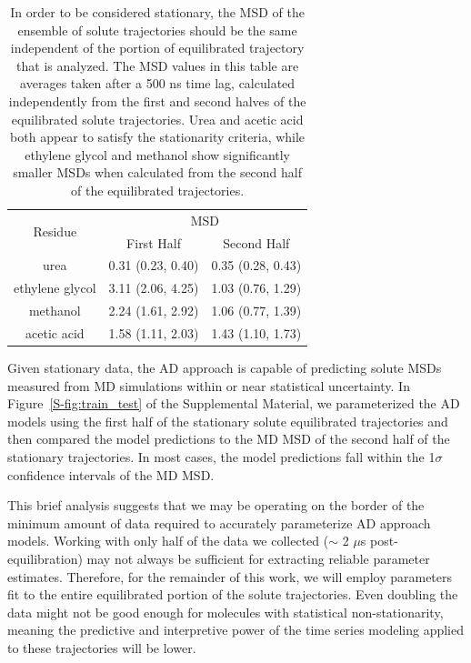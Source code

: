 \documentclass[aps,pre,preprint,groupedaddress,longbibliography]{revtex4-2}
\begin{document}
  \begin{table}[h]
  \centering
  \begin{tabular}{|c|c|c|}
  \hline
  \multirow{2}{*}{Residue} & \multicolumn{2}{c|}{MSD}            \\\cline{2-3}
                           & First Half       & Second Half      \\\hline
  urea                     & 0.31 (0.23, 0.40)& 0.35 (0.28, 0.43)\\\hline
  ethylene glycol          & 3.11 (2.06, 4.25)& 1.03 (0.76, 1.29)\\\hline
  methanol                 & 2.24 (1.61, 2.92)& 1.06 (0.77, 1.39)\\\hline
  acetic acid              & 1.58 (1.11, 2.03)& 1.43 (1.10, 1.73)\\\hline

  \end{tabular}
  \caption{In order to be considered stationary, the MSD of the ensemble of
	  solute trajectories should be the same independent of the portion of
	  equilibrated trajectory that is analyzed. The MSD values in this
	  table are averages taken after a 500 ns time lag, calculated
	  independently from the first and second halves of the equilibrated
	  solute trajectories. Urea and acetic acid both appear to satisfy the
	  stationarity criteria, while ethylene glycol and methanol show
	  significantly smaller MSDs when calculated from the second half of
	  the equilibrated trajectories.}\label{table:stationarity}
  \end{table}

  Given stationary data, the AD approach is capable of predicting solute MSDs
  measured from MD simulations within or near statistical uncertainty. In
  Figure~\ref{S-fig:train_test} of the Supplemental Material, we parameterized
  the AD models using the first half of the stationary solute equilibrated
  trajectories and then compared the model predictions to the MD MSD of the
  second half of the stationary trajectories. In most cases, the model
  predictions fall within the 1$\sigma$ confidence intervals of the MD MSD.
  
  This brief analysis suggests that we may be operating on the border of the
  minimum amount of data required to accurately parameterize AD approach
  models. Working with only half of the data we collected ($\sim$ 2 $\mu$s
  post-equilibration) may not always be sufficient for extracting reliable
  parameter estimates. Therefore, for the remainder of this work, we will
  employ parameters fit to the entire equilibrated portion of the solute
  trajectories. Even doubling the data might not be good enough for molecules
  with statistical non-stationarity, meaning the predictive and interpretive
  power of the time series modeling applied to these trajectories will be
  lower.
\end{document}

